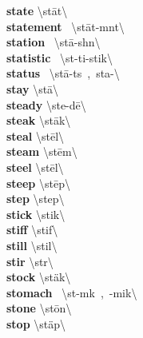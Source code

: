\documentclass[10pt,a4paper]{article}
\begin{document}
\begin{multicols}{2}
\textbf{ state }\quad \textbackslash \textprimstress st\={a}t\textbackslash \\
\textbf{ statement }\quad \ \textbackslash \textprimstress st\={a}t-m\textschwa nt\textbackslash \\
\textbf{ station }\quad \ \textbackslash \textprimstress st\={a}-sh\textschwa n\textbackslash \\
\textbf{ statistic }\quad \ \textbackslash st\textschwa -\textprimstress ti-stik\textbackslash \\
\textbf{ status }\quad \ \textbackslash \textprimstress st\={a}-t\textschwa s\ ,\ \textprimstress sta-\textbackslash \\
\textbf{ stay }\quad \textbackslash \textprimstress st\={a}\textbackslash \\
\textbf{ steady }\quad \textbackslash \textprimstress ste-d\={e}\textbackslash \\
\textbf{ steak }\quad \textbackslash \textprimstress st\={a}k\textbackslash \\
\textbf{ steal }\quad \textbackslash \textprimstress st\={e}l\textbackslash \\
\textbf{ steam }\quad \textbackslash \textprimstress st\={e}m\textbackslash \\
\textbf{ steel }\quad \textbackslash \textprimstress st\={e}l\textbackslash \\
\textbf{ steep }\quad \textbackslash \textprimstress st\={e}p\textbackslash \\
\textbf{ step }\quad \textbackslash \textprimstress step\textbackslash \\
\textbf{ stick }\quad \textbackslash \textprimstress stik\textbackslash \\
\textbf{ stiff }\quad \textbackslash \textprimstress stif\textbackslash \\
\textbf{ still }\quad \textbackslash \textprimstress stil\textbackslash \\
\textbf{ stir }\quad \textbackslash \textprimstress st\textschwa r\textbackslash \\
\textbf{ stock }\quad \textbackslash \textprimstress st\"{a}k\textbackslash \\
\textbf{ stomach }\quad \ \textbackslash \textprimstress st\textschwa -m\textschwa k\ ,\ -mik\textbackslash \\
\textbf{ stone }\quad \textbackslash \textprimstress st\={o}n\textbackslash \\
\textbf{ stop }\quad \textbackslash \textprimstress st\"{a}p\textbackslash \\

\end{multicols}
\end{document}
